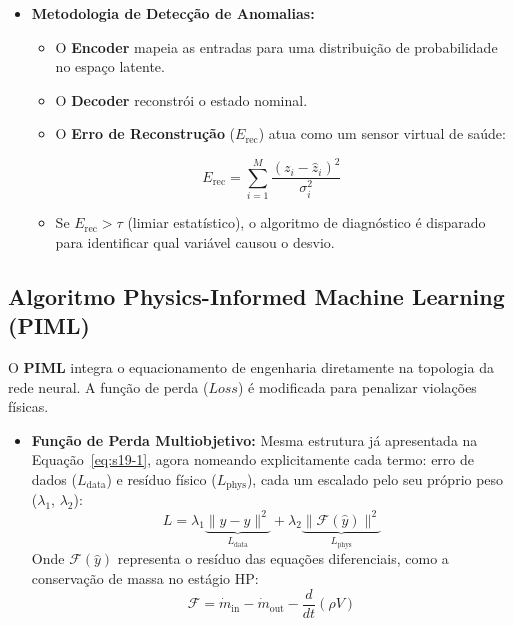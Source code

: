 \documentclass[12pt,a4paper]{article}
\numberwithin{equation}{section}
\numberwithin{table}{section}
\numberwithin{figure}{section}
\begin{document}
	\begin{itemize}
		\item \textbf{Metodologia de Detecção de Anomalias:}
		\begin{itemize}
			\item O \textbf{Encoder} mapeia as entradas para uma distribuição de probabilidade no espaço latente.
			\item O \textbf{Decoder} reconstrói o estado nominal.
			\item O \textbf{Erro de Reconstrução} ($E_{\text{rec}}$) atua como um sensor virtual de saúde:
		\end{itemize}
		\begin{equation}\label{eq:s20-4}
 E_{\text{rec}} = \sum_{i=1}^{M} \frac{(z_i - \hat{z}_i)^2}{\sigma_i^2} 
\end{equation}
		\begin{itemize}
			\item Se $E_{\text{rec}} > \tau$ (limiar estatístico), o algoritmo de diagnóstico é disparado para identificar qual variável causou o desvio.
		\end{itemize}
	\end{itemize}
	
	\subsection{Algoritmo Physics-Informed Machine Learning (PIML)}
	
	O \textbf{PIML} integra o equacionamento de engenharia diretamente na topologia da rede neural. A função de perda ($Loss$) é modificada para penalizar violações físicas.
	
	\begin{itemize}
		\item \textbf{Função de Perda Multiobjetivo:} Mesma estrutura já apresentada na Equação~\eqref{eq:s19-1}, agora nomeando explicitamente cada termo: erro de dados ($L_{\text{data}}$) e resíduo físico ($L_{\text{phys}}$), cada um escalado pelo seu próprio peso ($\lambda_1$, $\lambda_2$):
		\begin{equation}\label{eq:s20-5}
 L = \lambda_1 \underbrace{\| y - \hat{y} \|^2}_{L_{\text{data}}} + \lambda_2 \underbrace{\| \mathcal{F}(\hat{y}) \|^2}_{L_{\text{phys}}}
\end{equation}
		Onde $\mathcal{F}(\hat{y})$ representa o resíduo das equações diferenciais, como a conservação de massa no estágio HP:
		\begin{equation}\label{eq:s20-6}
 \mathcal{F} = \dot{m}_{\text{in}} - \dot{m}_{\text{out}} - \frac{d}{dt} (\rho V) 
\end{equation}
	\end{itemize}
	
\end{document}
